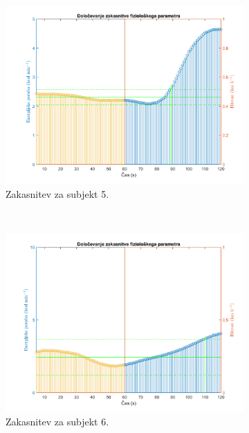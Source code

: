 \begin{figure}[htb]
\begin{subfigure}[t]{0.45\columnwidth}
\includegraphics[width=\columnwidth]{./Slike/lag-estimation-5-eem.png}
\caption{Zakasnitev za subjekt 5.}
\label{fig:lag-estimation-train-eem}
\end{subfigure}
~
\begin{subfigure}[t]{0.45\columnwidth}
\includegraphics[width=\columnwidth]{./Slike/lag-estimation-6-eem.png}
\caption{Zakasnitev za subjekt 6.}
\label{fig:lag-estimation-train-eem}
\end{subfigure}
\caption{}
\label{fig:lag-estimation-stage1}
\end{figure}



